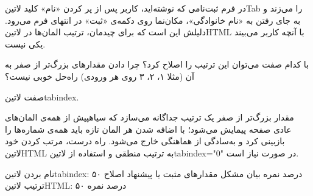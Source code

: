 
در فرم ثبت‌نامی که نوشته‌اید، کاربر پس از پر کردن «نام» کلید ‌لاتین{Tab} را می‌زند و به جای رفتن به «نام خانوادگی»، مکان‌نما روی دکمه‌ی «ثبت» در انتهای فرم می‌رود.
دلیلش این است که برای چیدمان، ترتیب المان‌ها در ‌لاتین{HTML} با آنچه کاربر می‌بیند یکی نیست.

 با کدام صفت می‌توان این ترتیب را اصلاح کرد؟
 چرا دادن مقدارهای بزرگ‌تر از صفر به آن (مثلا ۱، ۲، ۳ روی هر ورودی) راه‌حل خوبی نیست؟


\begin{پاسخ}

صفت ‌لاتین{tabindex}.

مقدار بزرگ‌تر از صفر یک ترتیب جداگانه می‌سازد که ‌سیاه{پیش از} همه‌ی المان‌های عادی صفحه پیمایش می‌شود؛
با اضافه شدن هر المان تازه باید همه‌ی شماره‌ها را بازبینی کرد و به‌سادگی از هماهنگی خارج می‌شود.
راه درست، مرتب کردن خود ‌لاتین{HTML} به ترتیب منطقی و استفاده از ‌لاتین{tabindex="0"} در صورت نیاز است.

 نام بردن ‌لاتین{tabindex}: ۵۰ درصد نمره
 بیان مشکل مقدارهای مثبت یا پیشنهاد اصلاح ترتیب ‌لاتین{HTML}: ۵۰ درصد نمره

\end{پاسخ}
